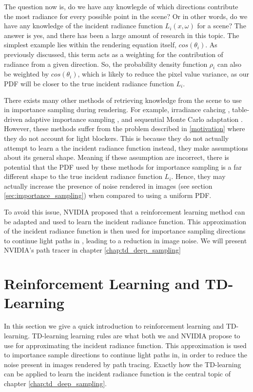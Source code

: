 \documentclass[../dissertation.tex]{subfiles}
\begin{document}
The question now is, do we have any knowlegde of which directions contribute the most radiance for every possible point in the scene? Or in other words, do we have any knowledge of the incident radiance function $L_i(x, \omega)$ for a scene? The answer is yes, and there has been a large amount of research in this topic. The simplest example lies within the rendering equation itself, $cos(\theta_i)$. As previously discussed, this term acts as a weighting for the contribution of radiance from a given direction. So, the probability density function $\rho_i$ can also be weighted by $cos(\theta_i)$, which is likely to reduce the pixel value variance, as our PDF will be closer to the true incident radiance function $L_i$. 

There exists many other methods of retrieving knowledge from the scene to use in importance sampling during rendering. For example, irradiance cahcing \cite{bashford2012significance}, table-driven adaptive importance sampling \cite{cline2008table}, and sequential Monte Carlo adaptation \cite{pegoraro2008towards}. However, these methods suffer from the problem described in \ref{motivation} where they do not account for light blockers. This is because they do not actually attempt to learn a the incident radiance function instead, they make assumptions about its general shape. Meaning if these assumption are incorrect, there is potential that the PDF used by these methods for importance sampling is a far different shape to the true incident radiance function $L_i$. Hence, they may actually increase the presence of noise rendered in images (see section \ref{sec:importance_sampling}) when compared to using a uniform PDF. 

To avoid this issue, NVIDIA proposed that a reinforcement learning method can be adapted and used to learn the incident radiance function. This approximation of the incident radiance function is then used for importance sampling directions to continue light paths in \cite{dahm2017learning}, leading to a reduction in image noise. We will present NVIDIA's path tracer in chapter \ref{chap:td_deep_sampling}


\section{Reinforcement Learning and TD-Learning}

In this section we give a quick introduction to reinforcement learning and TD-learning. TD-learning learning rules are what both we and NVIDIA propose to use for approximating the incident radiance function. This approximation is used to importance sample directions to continue light paths in, in order to reduce the noise present in images rendered by path tracing. Exactly how the TD-learning can be applied to learn the incident radiance function is the central topic of chapter \ref{chap:td_deep_sampling}.
\end{document}

